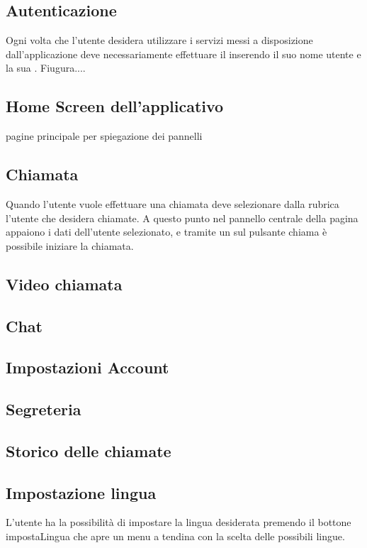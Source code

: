 \subsection{Autenticazione}
Ogni volta che l'utente desidera utilizzare i servizi messi a disposizione dall'applicazione deve necessariamente effettuare il  inserendo il suo nome utente e la sua .
Fiugura....

\subsection{Home Screen dell'applicativo }
pagine principale per spiegazione dei pannelli


\subsection{Chiamata}
Quando l'utente vuole effettuare una chiamata deve selezionare dalla rubrica l'utente che desidera chiamate. A questo punto nel pannello centrale della pagina appaiono i dati dell'utente selezionato, e tramite un  sul pulsante chiama è possibile iniziare la chiamata.
\subsection{Video chiamata}
\subsection{Chat}
\subsection{Impostazioni Account}
\subsection{Segreteria}
\subsection{Storico delle chiamate}
\subsection{Impostazione lingua}
L'utente ha la possibilità di impostare la lingua desiderata premendo il bottone impostaLingua che apre un menu a tendina con la scelta delle possibili lingue.




